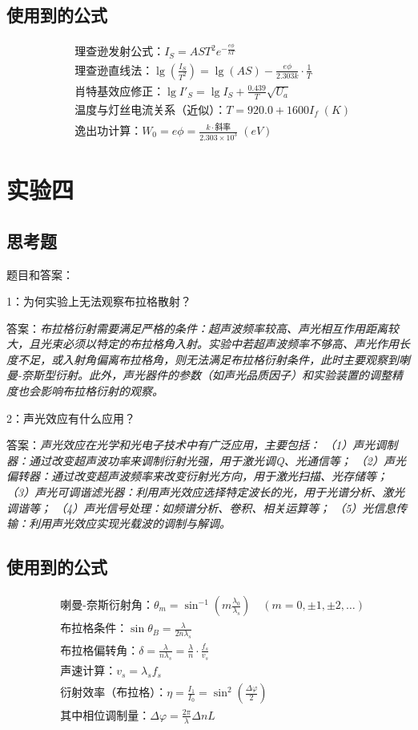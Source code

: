 \documentclass[10pt,journal,compsoc]{IEEEtran}
\begin{document}
\subsection{使用到的公式}
\begin{align*}
&\text{理查逊发射公式：} I_S = A S T^2 e^{-\frac{e\phi}{kT}} \\
&\text{理查逊直线法：} \lg\left(\frac{I_S}{T^2}\right) = \lg(AS) - \frac{e\phi}{2.303 k} \cdot \frac{1}{T} \\
&\text{肖特基效应修正：} \lg I'_S = \lg I_S + \frac{0.439}{T} \sqrt{U_a} \\
&\text{温度与灯丝电流关系（近似）：} T = 920.0 + 1600 I_f \; (K) \\
&\text{逸出功计算：} W_0 = e\phi = \frac{k \cdot \text{斜率}}{2.303 \times 10^3} \; (eV)
\end{align*}
    
\section{实验四}
\subsection{思考题}
题目和答案：

1：为何实验上无法观察布拉格散射？

答案：\textit{布拉格衍射需要满足严格的条件：超声波频率较高、声光相互作用距离较大，且光束必须以特定的布拉格角入射。实验中若超声波频率不够高、声光作用长度不足，或入射角偏离布拉格角，则无法满足布拉格衍射条件，此时主要观察到喇曼-奈斯型衍射。此外，声光器件的参数（如声光品质因子）和实验装置的调整精度也会影响布拉格衍射的观察。}

2：声光效应有什么应用？

答案：\textit{声光效应在光学和光电子技术中有广泛应用，主要包括：
（1）声光调制器：通过改变超声波功率来调制衍射光强，用于激光调Q、光通信等；
（2）声光偏转器：通过改变超声波频率来改变衍射光方向，用于激光扫描、光存储等；
（3）声光可调谐滤光器：利用声光效应选择特定波长的光，用于光谱分析、激光调谐等；
（4）声光信号处理：如频谱分析、卷积、相关运算等；
（5）光信息传输：利用声光效应实现光载波的调制与解调。}

\subsection{使用到的公式}
\begin{align*}
&\text{喇曼-奈斯衍射角：} \theta_m = \sin^{-1}\left( m \frac{\lambda_0}{\lambda_s} \right) \quad (m = 0, \pm 1, \pm 2, \dots) \\
&\text{布拉格条件：} \sin\theta_B = \frac{\lambda}{2 n \lambda_s} \\
&\text{布拉格偏转角：} \delta = \frac{\lambda}{n \lambda_s} = \frac{\lambda}{n} \cdot \frac{f_s}{v_s} \\
&\text{声速计算：} v_s = \lambda_s f_s \\
&\text{衍射效率（布拉格）：} \eta = \frac{I_1}{I_0} = \sin^2\left( \frac{\Delta \varphi}{2} \right) \\
&\text{其中相位调制量：} \Delta \varphi = \frac{2\pi}{\lambda} \Delta n L
\end{align*}
\end{document}
